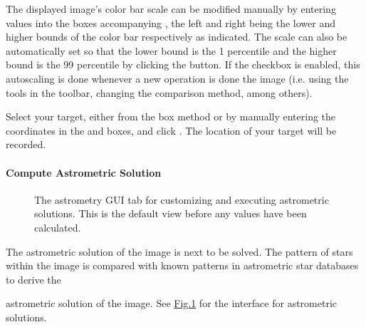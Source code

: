 \documentclass[letterpaper,11pt,english]{sphinxmanual}
\begin{document}
\sphinxAtStartPar
The displayed image’s color bar scale can be modified manually by entering
values into the boxes accompanying , the left and
right being the lower and higher bounds of the color bar respectively as
indicated. The scale can also be automatically set so that the lower bound is
the 1 percentile and the higher bound is the 99 percentile by clicking the
 button. If the  checkbox is enabled,
this autoscaling is done whenever a new operation is done the image (i.e.
using the tools in the toolbar, changing the comparison method, among others).

\sphinxAtStartPar
Select your target, either from the box method or by manually entering the
coordinates in the  and  boxes, and
click . The location of your target will be recorded.


\paragraph{Compute Astrometric Solution}
\label{\detokenize{user/manual_mode:compute-astrometric-solution}}\label{\detokenize{user/manual_mode:user-manual-mode-procedure-find-asteroid-location-compute-astrometric-solution}}
\begin{figure}[H]
\centering
\capstart

\noindent{}
\caption{The astrometry GUI tab for customizing and executing astrometric solutions.
This is the default view before any values have been calculated.}\label{\detokenize{user/manual_mode:id5}}\label{\detokenize{user/manual_mode:figure-manual-mode-gui-astrometry}}\end{figure}

\sphinxAtStartPar
The astrometric solution of the image is next to be solved. The pattern of
stars within the image is compared with known patterns in astrometric star
databases to derive the %
\begin{footnote}[6]\sphinxAtStartFootnote
{}
%
\end{footnote}
astrometric solution of the image. See \hyperref[\detokenize{user/manual_mode:figure-manual-mode-gui-astrometry}]{Fig.\@ \ref{\detokenize{user/manual_mode:figure-manual-mode-gui-astrometry}}}
for the interface for astrometric solutions.
\end{document}
